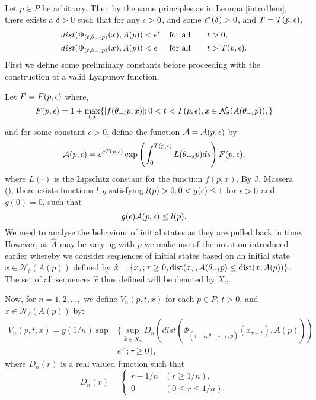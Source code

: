 \begin{prf} \hfill \\
Let $p \in P$ be arbitrary. Then by the same principles as in Lemma
\ref{intro1lem}, there exists a $\delta > 0$ such that for any $\epsilon > 0$, and
some $\epsilon^*(\delta) > 0$, and $T = T(p, \epsilon)$,
\begin{align*}
  dist(\Phi_{(t, \theta_{-t}p)}(x), A(p)) &< \epsilon^*& \text{for all} \qquad & t >
    0, \\
  dist(\Phi_{(t, \theta_{-t}p)}(x), A(p)) &< \epsilon& \text{for all} \qquad & t >
    T(p, \epsilon). \\
\end{align*}
First we define some preliminary constants before proceeding with the
construction of a valid Lyapunov function.

Let $F= F(p, \epsilon)$ where,
\[ F(p, \epsilon)= 1 + \max_{t,x} \{ |f(\theta_{-t} p, x)| ; 0 < t < T( p, \epsilon), x \in
  \mathcal{N}_{\delta}(A(\theta_{-t}p)), \} \]
and for some constant $c > 0$, define the function $\mathcal{A} =
\mathcal{A}(p, \epsilon)$ by
\[\mathcal{A}(p, \epsilon) = e^{cT(p, \epsilon)} \exp \left(  \int_0^{T(p,
                   \epsilon)}  L(\theta_{-s} p)ds \right)  F(p, \epsilon),  \]
where $L(\cdot)$ is the Lipschitz constant for the function $f(p, x)$. By
J. Massera (\cite{Yo66}), there exists functions $l, g$ satisfying $l(p) > 0, 0
< g(\epsilon) \leq 1$ for $\epsilon > 0$ and $g(0) = 0$, such that
\[ g(\epsilon)\mathcal{A}(p,\epsilon) \leq l(p). \]
We need to analyse the behaviour of initial states as they are pulled back
in time. However, as $\hat{A}$ may be varying with $p$ we  make use of the
notation introduced earlier whereby we consider sequences of initial states
based on an initial state $x \in \mathcal{N}_{\delta}(A(p))$ defined by
$\hat{x} = \{ x_{\tau} ; \tau \geq 0, {\rm dist}(x_{\tau}, A(\theta_{-t}p) \leq
{\rm dist}(x, A(p)) \}$. The set of all sequences $\hat{x}$ thus defined
will be denoted by $X_x$.

Now, for $n=1,2,\dots,$ we define $V_n(p, t, x)$ for each $p \in P$, $t
> 0$, and $x \in \mathcal{N}_{\delta}(A(p))$ by:
\begin{align*}
  V_n(p, t, x) = g(1/n) \sup &\{ \sup_{\hat{x} \in X_x}
        D_n(dist(\Phi_{(\tau+t, \theta_{-(\tau+t)}
        p)}(x_{\tau+t}),A(p))) \\
  & e^{c\tau} ; \tau \geq 0 \},
\end{align*}
where $D_n( r )$ is a real valued function such that
\begin{equation*}
  D_n( r ) = \begin{cases}
  r - 1/n & ( r \geq 1/n ), \\
  0 & ( 0 \leq r \leq 1/n ).
  \end{cases}
\end{equation*}


\end{prf}
